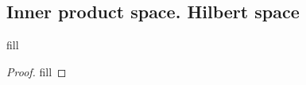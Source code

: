 \subsection{Inner product space. Hilbert space}

\begin{exercise}{1}
fill
\end{exercise}
\begin{proof}
fill
\end{proof}